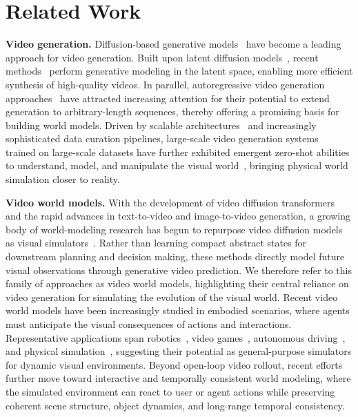 \documentclass{llmxive}
\begin{document}
\section{Related Work}

\noindent\textbf{Video generation.}
Diffusion-based generative models~\cite{ho2020denoising, lipman2022flow, song2020score} have become a leading approach for video generation.
Built upon latent diffusion models~\cite{rombach2022high}, recent methods~\cite{chen2024videocrafter2, guo2023animatediff, yang2024cogvideox} perform generative modeling in the latent space, enabling more efficient synthesis of high-quality videos.
In parallel, autoregressive video generation approaches~\cite{chen2024diffusion, henschel2025streamingt2v, kim2024fifo} have attracted increasing attention for their potential to extend generation to arbitrary-length sequences, thereby offering a promising basis for building world models.
Driven by scalable architectures~\cite{peebles2023scalable} and increasingly sophisticated data curation pipelines, large-scale video generation systems~\cite{veo, sora, wan, kling, gao2025seedance, kong2024hunyuanvideo} trained on large-scale datasets have further exhibited emergent zero-shot abilities to understand, model, and manipulate the visual world~\cite{wiedemer2025video}, bringing physical world simulation closer to reality.

\noindent\textbf{Video world models.}
With the development of video diffusion transformers and the rapid advances in text-to-video and image-to-video generation, a growing body of world-modeling research has begun to repurpose video diffusion models as visual simulators~\cite{yang2023unisim,bar2025navigation,liang2024dreamitate}.
Rather than learning compact abstract states for downstream planning and decision making, these methods directly model future visual observations through generative video prediction.
We therefore refer to this family of approaches as video world models, highlighting their central reliance on video generation for simulating the evolution of the visual world.
Recent video world models have been increasingly studied in embodied scenarios, where agents must anticipate the visual consequences of actions and interactions.
Representative applications span robotics~\cite{mereu2025generative,yang2023learning,li2025unified,li2026causal,ye2026world,gao2026dreamdojo}, video games~\cite{alonso2024diffusion,he2025matrix,valevski2024diffusion,xiao2025worldmem, fan2022minedojo}, autonomous driving~\cite{agarwal2025cosmos,hu2023gaia}, and physical simulation~\cite{li2025pisa,yuan2026inference}, suggesting their potential as general-purpose simulators for dynamic visual environments.
Beyond open-loop video rollout, recent efforts~\cite{hyworld2025,worldplay2025,yu2025cam} further move toward interactive and temporally consistent world modeling, where the simulated environment can react to user or agent actions while preserving coherent scene structure, object dynamics, and long-range temporal consistency.
\end{document}
